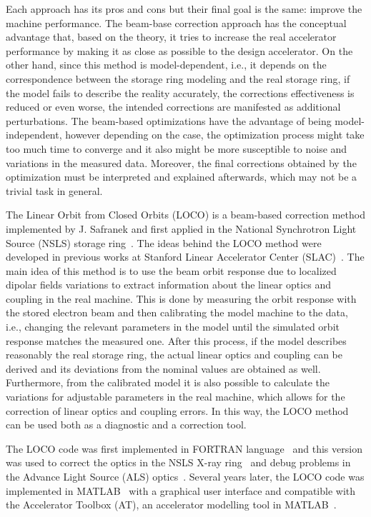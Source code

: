 Each approach has its pros and cons but their final goal is the same: improve the machine performance. The beam-base correction approach has the conceptual advantage that, based on the theory, it tries to increase the real accelerator performance by making it as close as possible to the design accelerator. On the other hand, since this method is model-dependent, i.e., it depends on the correspondence between the storage ring modeling and the real storage ring, if the model fails to describe the reality accurately, the corrections effectiveness is reduced or even worse, the intended corrections are manifested as additional perturbations. The beam-based optimizations have the advantage of being model-independent, however depending on the case, the optimization process might take too much time to converge and it also might be more susceptible to noise and variations in the measured data. Moreover, the final corrections obtained by the optimization must be interpreted and explained afterwards, which may not be a trivial task in general.

The Linear Orbit from Closed Orbits (LOCO) is a beam-based correction method implemented by J. Safranek and first applied in the National Synchrotron Light Source (NSLS) storage ring~\cite{safranek1994, safranek1995, safranek1997}. The ideas behind the LOCO method were developed in previous works at Stanford Linear Accelerator Center (SLAC)~\cite{martin1992, corbett1993}. The main idea of this method is to use the beam orbit response due to localized dipolar fields variations to extract information about the linear optics and coupling in the real machine. This is done by measuring the orbit response with the stored electron beam and then calibrating the model machine to the data, i.e., changing the relevant parameters in the model until the simulated orbit response matches the measured one. After this process, if the model describes reasonably the real storage ring, the actual linear optics and coupling can be derived and its deviations from the nominal values are obtained as well. Furthermore, from the calibrated model it is also possible to calculate the variations for adjustable parameters in the real machine, which allows for the correction of linear optics and coupling errors. In this way, the LOCO method can be used both as a diagnostic and a correction tool.

The LOCO code was first implemented in FORTRAN language~\cite{icfa_safranek} and this version was used to correct the optics in the NSLS X-ray ring~\cite{safranek1997} and debug problems in the Advance Light Source (ALS) optics~\cite{robin1996}. Several years later, the LOCO code was implemented in MATLAB~\cite{safranek2002, icfa_greg} with a graphical user interface and compatible with the Accelerator Toolbox (AT), an accelerator modelling tool in MATLAB~\cite{terebilo2001}. 

